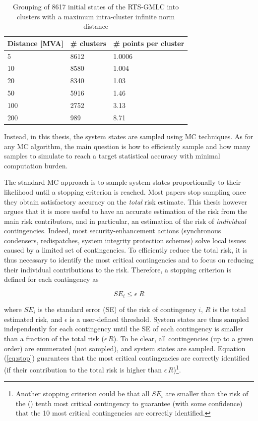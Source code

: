 \begin{table}
\centering
\caption{Grouping of 8617 initial states of the RTS-GMLC into clusters with a maximum intra-cluster infinite norm distance}
\label{tab:clustering}
\begin{tabular}{@{}lll@{}}
\toprule
Distance [MVA] & \# clusters & \# points per cluster \\ \midrule
5             & 8612        & 1.0006    \\
10            & 8580        & 1.004     \\
20            & 8340        & 1.03      \\
50            & 5916        & 1.46      \\
100           & 2752        & 3.13      \\
200           & 989         & 8.71      \\ \bottomrule
\end{tabular}
\end{table}

Instead, in this thesis, the system states are sampled using MC techniques. As for any MC algorithm, the main question is how to efficiently sample and how many samples to simulate to reach a target statistical accuracy with minimal computation burden.

The standard MC approach is to sample system states proportionally to their likelihood until a stopping criterion is reached. Most papers stop sampling once they obtain satisfactory accuracy on the \emph{total} risk estimate. This thesis however argues that it is more useful to have an accurate estimation of the risk from the main risk contributors, and in particular, an estimation of the risk of \emph{individual} contingencies. Indeed, most security-enhancement actions (synchronous condensers, redispatches, system integrity protection schemes) solve local issues caused by a limited set of contingencies. To efficiently reduce the total risk, it is thus necessary to identify the most critical contingencies and to focus on reducing their individual contributions to the risk. Therefore, a stopping criterion is defined for each contingency as

\begin{equation}
  \label{eq:stop}
  SE_i \leq \epsilon \; R
\end{equation}

\noindent where \(SE_i\) is the standard error (SE) of the risk of contingency \(i\), \(R\) is the total estimated risk, and \(\epsilon\) is a user-defined threshold. System states are thus sampled independently for each contingency until the SE of each contingency is smaller than a fraction of the total risk (\(\epsilon \, R\)). To be clear, all contingencies (up to a given order) are enumerated (not sampled), and system states are sampled. Equation (\ref{eq:stop}) guarantees that the most critical contingencies are correctly identified (if their contribution to the total risk is higher than \(\epsilon \, R\))\footnote{Another stopping criterion could be that all \(SE_i\) are smaller than the risk of the (\eg) tenth most critical contingency to guarantee (with some confidence) that the 10 most critical contingencies are correctly identified.}.

